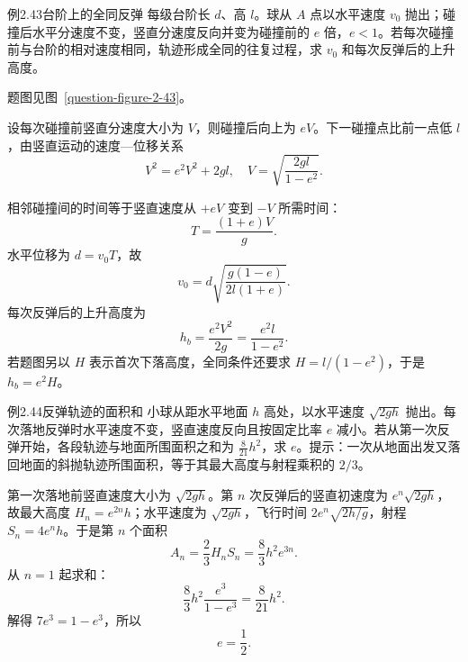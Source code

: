 \begin{origexamplebox}{例2.43\quad 台阶上的全同反弹}
每级台阶长 $d$、高 $l$。球从 $A$ 点以水平速度 $v_0$ 抛出；碰撞后水平分速度不变，竖直分速度反向并变为碰撞前的 $e$ 倍，$e<1$。若每次碰撞前与台阶的相对速度相同，轨迹形成全同的往复过程，求 $v_0$ 和每次反弹后的上升高度。
\par 题图见图~\ref{question-figure-2-43}。
\KQuestionBR
\end{origexamplebox}
\begin{xesolution}
设每次碰撞前竖直分速度大小为 $V$，则碰撞后向上为 $eV$。下一碰撞点比前一点低 $l$，由竖直运动的速度—位移关系
\[
V^2=e^2V^2+2gl,
\quad
V=\sqrt{\frac{2gl}{1-e^2}}.
\]
\StairBounceDiagram

相邻碰撞间的时间等于竖直速度从 $+eV$ 变到 $-V$ 所需时间：
\[
T=\frac{(1+e)V}{g}.
\]
水平位移为 $d=v_0T$，故
\[
 \boxed{v_0=d\sqrt{\frac{g(1-e)}{2l(1+e)}}}.
\]
每次反弹后的上升高度为
\[
 \boxed{h_b=\frac{e^2V^2}{2g}=\frac{e^2l}{1-e^2}}.
\]
若题图另以 $H$ 表示首次下落高度，全同条件还要求 $H=l/(1-e^2)$，于是 $h_b=e^2H$。
\end{xesolution}

\begin{origexamplebox}{例2.44\quad 反弹轨迹的面积和}
小球从距水平地面 $h$ 高处，以水平速度 $\sqrt{2gh}$ 抛出。每次落地反弹时水平速度不变，竖直速度反向且按固定比率 $e$ 减小。若从第一次反弹开始，各段轨迹与地面所围面积之和为 $\frac{8}{21}h^2$，求 $e$。提示：一次从地面出发又落回地面的斜抛轨迹所围面积，等于其最大高度与射程乘积的 $2/3$。
\end{origexamplebox}
\begin{xesolution}
第一次落地前竖直速度大小为 $\sqrt{2gh}$。第 $n$ 次反弹后的竖直初速度为 $e^n\sqrt{2gh}$，故最大高度 $H_n=e^{2n}h$；水平速度为 $\sqrt{2gh}$，飞行时间 $2e^n\sqrt{2h/g}$，射程 $S_n=4e^nh$。于是第 $n$ 个面积
\[
A_n=\frac23H_nS_n=\frac83h^2e^{3n}.
\]
从 $n=1$ 起求和：
\[
\frac83h^2\frac{e^3}{1-e^3}=\frac8{21}h^2.
\]
解得 $7e^3=1-e^3$，所以
\[
 \boxed{e=\frac12}.
\]
\end{xesolution}

